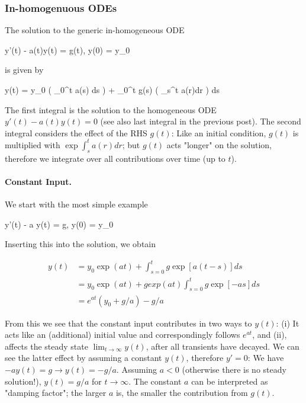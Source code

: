
\subsubsection{In-homogenuous ODEs}

The solution to the generic in-homogeneous ODE

\bee
y'(t) - a(t)y(t) = g(t), \quad y(0) = y_0
\eee

is given by

\bee
y(t) = y_0 \exp \left( \int_0^t a(s) ds \right) + \int_0^t g(s) \left( \exp \int_s^t a(r)dr \right) ds
\eee

The first integral is the solution to the homogeneous ODE $y'(t) - a(t)y(t) = 0$ (see also last integral in the previous post). The second integral considers the effect of the RHS $g(t)$: Like an initial condition, $g(t)$ is multiplied with $\exp \int_s^t a(r)dr$; but $g(t)$ acts "longer" on the solution, therefore we integrate over all contributions over time (up to $t$).

\paragraph{Constant Input.} We start with the most simple example

\bee
y'(t) - a y(t) = g, \quad y(0) = y_0
\eee

Inserting this into the solution, we obtain

\begin{align*}
y(t) & = y_0 \exp (at) + \int_{s=0}^t g \exp \left[ a(t-s)\right] ds \\
&= y_0 \exp(at) +gexp(at) \int_{s=0}^t g \exp \left[ -as \right] ds \\
&= e^{at} (y_0 + g/a) - g/a
\end{align*}

From this we see that the constant input contributes in two ways to $y(t)$: (i) It acts like an (additional) initial value and correspondingly follows $e^{at}$, and (ii), affects the steady state $\lim_{t \rightarrow \infty} y(t)$, after all transients have decayed. We can see the latter effect by assuming a constant $y(t)$, therefore $y' = 0$: We have $-ay(t) = g \rightarrow y(t) = -g/a$. Assuming $a < 0$ (otherwise there is no steady solution!), $y(t) = g/a$ for $t \rightarrow \infty$. The constant $a$ can be interpreted as "damping factor"; the larger $a$ is, the smaller the contribution from $g(t)$.

